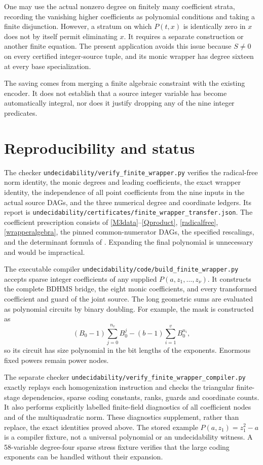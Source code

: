 \documentclass[11pt]{article}
\begin{document}
One may use the actual nonzero degree on finitely many coefficient
strata, recording the vanishing higher coefficients as polynomial
conditions and taking a finite disjunction.  However, a stratum on
which \(P(t,x)\) is identically zero in \(x\) does not by itself permit
eliminating \(x\).  It requires a separate construction or another
finite equation.  The present application avoids this issue because
\(S\ne0\) on every certified integer-source tuple, and its monic wrapper
has degree sixteen at every base specialization.

The saving comes from merging a finite algebraic constraint with the
existing encoder.  It does not establish that a source integer
variable has become automatically integral, nor does it justify
dropping any of the nine integer predicates.

\section{Reproducibility and status}

The checker
\nolinkurl{undecidability/verify_finite_wrapper.py}
verifies the radical-free norm identity, the monic degrees and leading
coefficients, the exact wrapper identity, the independence of all
point coefficients from the nine inputs in the actual source DAGs,
and the three numerical degree and coordinate ledgers.  Its report is
\nolinkurl{undecidability/certificates/finite_wrapper_transfer.json}.
The coefficient prescription consists of
\eqref{M3data}--\eqref{Qproduct},
\eqref{radicalfree}, \eqref{wrapperalgebra}, the pinned common-numerator
DAGs, the specified rescalings, and the determinant formula of
\cite{Encoder}.  Expanding the final polynomial is unnecessary and
would be impractical.

The executable compiler
\nolinkurl{undecidability/code/build_finite_wrapper.py} accepts sparse
integer coefficients of any supplied \(P(a,z_1,\ldots,z_\nu)\).
It constructs the complete BDHMS bridge, the eight monic coefficients,
and every transformed coefficient and guard of the joint source.
The long geometric sums are evaluated as polynomial circuits by binary
doubling.  For example, the mask is constructed as
\[
 (B_0-1)\sum_{j=0}^{n_v}B_0^j
       -(b-1)\sum_{i=1}^{v}B_0^{n_i},
\]
so its circuit has size polynomial in the bit lengths of the exponents.
Enormous fixed powers remain power nodes.

The separate checker
\nolinkurl{undecidability/verify_finite_wrapper_compiler.py}
exactly replays each homogenization instruction and checks the
triangular finite-stage dependencies, sparse coding constants, ranks,
guards and coordinate counts.  It also performs explicitly labelled
finite-field diagnostics of all coefficient nodes and of the
multiquadratic norm.  These diagnostics supplement, rather than
replace, the exact identities proved above.  The stored example
\(P(a,z_1)=z_1^2-a\) is a compiler fixture, not a universal polynomial
or an undecidability witness.  A 58-variable degree-four sparse
stress fixture verifies that the large coding exponents can be
handled without their expansion.
\end{document}
